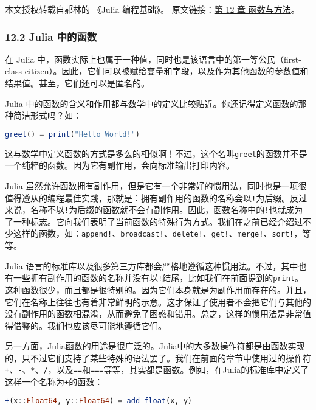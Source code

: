 
本文授权转载自郝林的 《Julia 编程基础》。 原文链接：\href{https://github.com/hyper0x/JuliaBasics/blob/master/book/ch12.md}{第 12 章 函数与方法}。

\subsubsection{12.2 Julia 中的函数}

在 Julia 中，函数实际上也属于一种值，同时也是该语言中的第一等公民（first-class citizen）。因此，它们可以被赋给变量和字段，以及作为其他函数的参数值和结果值。甚至，它们还可以是匿名的。

Julia 中的函数的含义和作用都与数学中的定义比较贴近。你还记得定义函数的那种简洁形式吗？如：

\begin{lstlisting}[language=julia]
greet() = print("Hello World!")
\end{lstlisting}

这与数学中定义函数的方式是多么的相似啊！不过，这个名叫\verb`greet`的函数并不是一个纯粹的函数。因为它有副作用，会向标准输出打印内容。

Julia 虽然允许函数拥有副作用，但是它有一个非常好的惯用法，同时也是一项很值得遵从的编程最佳实践，那就是：拥有副作用的函数的名称会以\verb`!`为后缀。反过来说，名称不以\verb`!`为后缀的函数就不会有副作用。因此，函数名称中的\verb`!`也就成为了一种标志。它向我们表明了当前函数的特殊行为方式。我们在之前已经介绍过不少这样的函数，如：\verb`append!`、\verb`broadcast!`、\verb`delete!`、\verb`get!`、\verb`merge!`、\verb`sort!`，等等。

Julia 语言的标准库以及很多第三方库都会严格地遵循这种惯用法。不过，其中也有一些拥有副作用的函数的名称并没有以\verb`!`结尾，比如我们在前面提到的\verb`print`。这种函数很少，而且都是很特别的。因为它们本身就是为副作用而存在的。并且，它们在名称上往往也有着非常鲜明的示意。这才保证了使用者不会把它们与其他的没有副作用的函数相混淆，从而避免了困惑和错用。总之，这样的惯用法是非常值得借鉴的。我们也应该尽可能地遵循它们。

另一方面，Julia函数的用途是很广泛的。Julia中的大多数操作符都是由函数实现的，只不过它们支持了某些特殊的语法罢了。我们在前面的章节中使用过的操作符\verb`+`、\verb`-`、\verb`*`、\verb`/`，以及\verb`==`和\verb`===`等等，其实都是函数。例如，在Julia的标准库中定义了这样一个名称为\verb`+`的函数：

\begin{lstlisting}[language=julia]
+(x::Float64, y::Float64) = add_float(x, y)
\end{lstlisting}


